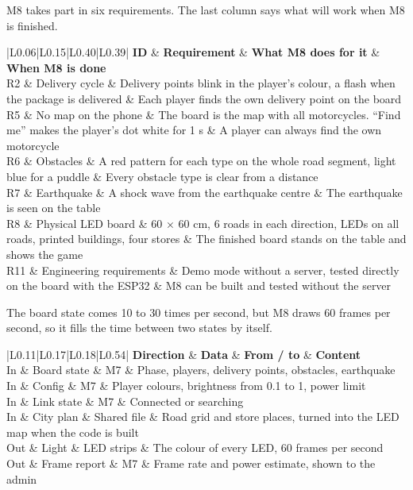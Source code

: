 \documentclass[
  english,
  10pt,
  a4paper,
]{article}
\newcommand{\ckkeep}[1]{\par\noindent\begin{minipage}{\linewidth}\setlength{\parskip}{4pt}#1\end{minipage}\par\smallskip}
\begin{document}
\ckkeep{%
M8 takes part in six requirements. The last column says what will work when M8 is finished.

\begin{tabular}{|L{0.06}|L{0.15}|L{0.40}|L{0.39}|}
\hline \textbf{ID} & \textbf{Requirement} & \textbf{What M8 does for it} & \textbf{When M8 is done} \\ \hline 
R2 & Delivery cycle & Delivery points blink in the player's colour, a flash when the package is delivered & Each player finds the own delivery point on the board \\ \hline
R5 & No map on the phone & The board is the map with all motorcycles. ``Find me'' makes the player's dot white for 1 s & A player can always find the own motorcycle \\ \hline
R6 & Obstacles & A red pattern for each type on the whole road segment, light blue for a puddle & Every obstacle type is clear from a distance \\ \hline
R7 & Earthquake & A shock wave from the earthquake centre & The earthquake is seen on the table \\ \hline
R8 & Physical LED board & 60 × 60 cm, 6 roads in each direction, LEDs on all roads, printed buildings, four stores & The finished board stands on the table and shows the game \\ \hline
R11 & Engineering requirements & Demo mode without a server, tested directly on the board with the ESP32 & M8 can be built and tested without the server \\ \hline
\end{tabular}}


\ckkeep{%
The board state comes 10 to 30 times per second, but M8 draws 60 frames per second, so it fills the
time between two states by itself.

\begin{tabular}{|L{0.11}|L{0.17}|L{0.18}|L{0.54}|}
\hline \textbf{Direction} & \textbf{Data} & \textbf{From / to} & \textbf{Content} \\ \hline 
In & Board state & M7 & Phase, players, delivery points, obstacles, earthquake \\ \hline
In & Config & M7 & Player colours, brightness from 0.1 to 1, power limit \\ \hline
In & Link state & M7 & Connected or searching \\ \hline
In & City plan & Shared file & Road grid and store places, turned into the LED map when the code is built \\ \hline
Out & Light & LED strips & The colour of every LED, 60 frames per second \\ \hline
Out & Frame report & M7 & Frame rate and power estimate, shown to the admin \\ \hline
\end{tabular}}
\end{document}
